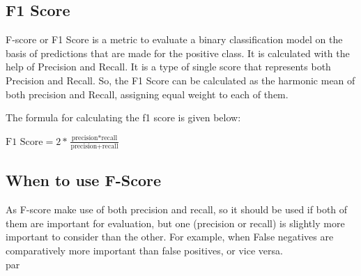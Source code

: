     \subsection{F1 Score}
    F-score or F1 Score is a metric to evaluate a binary classification model on the basis of predictions that are made for the positive class. It is calculated with the help of Precision and Recall. It is a type of single score that represents both Precision and Recall. So, the F1 Score can be calculated as the harmonic mean of both precision and Recall, assigning equal weight to each of them.\par \vspace{1em}

    The formula for calculating the f1 score is given below\cite{c-eval}: 
    \begin{center}
        \(\displaystyle{\text{F1 Score} = 2 * \frac{\text{precision} * \text{recall}}{\text{precision} + \text{recall}}}\) 
    \end{center}

    \subsection{When to use F-Score}
    As F-score make use of both precision and recall, so it should be used if both of them are important for evaluation, but one (precision or recall) is slightly more important to consider than the other. For example, when False negatives are comparatively more important than false positives, or vice versa.\\par \vspace{1em}
    
    
